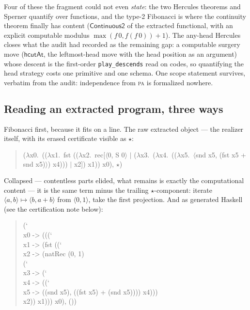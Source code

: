 Four of these the fragment could not even \emph{state}: the two Hercules
theorems and Sperner quantify over functions, and the type-2 Fibonacci is
where the continuity theorem finally has content ($\mathsf{Continuous2}$ of
the extracted functional, with an explicit computable modulus
$\max(f\,0, f(f\,0))+1$). The any-head Hercules closes what the audit had
recorded as the remaining gap: a computable surgery move ($\mathsf{hcutAt}$,
the leftmost-head move with the head position as an argument) whose descent
is the first-order \texttt{play\_descends} read on codes, so quantifying
the head strategy costs one primitive and one schema. One scope statement
survives, verbatim from the audit: independence from \textsc{pa} is
formalized nowhere.

\subsection*{Reading an extracted program, three ways}

Fibonacci first, because it fits on a line. The raw extracted object ---
the realizer itself, with its erased certificate visible as $\star$:
\begin{quote}\ttfamily\small
($\lambda$x0.\ (($\lambda$x1.\ fst (($\lambda$x2.\ rec[$\langle$0, S 0$\rangle$
$\mid$ ($\lambda$x3.\ ($\lambda$x4.\ (($\lambda$x5.\ $\langle$snd x5, (fst x5 + snd
x5)$\rangle$) x4))) $\mid$ x2]) x1)) x0), $\star$)
\end{quote}
Collapsed --- contentless parts elided, what remains is exactly the
computational content --- it is the same term minus the trailing
$\star$-component: iterate $\langle a,b\rangle \mapsto \langle b,
a{+}b\rangle$ from $\langle 0,1\rangle$, take the first projection. And as
generated Haskell (see the certification note below):
\begin{quote}\ttfamily\small
(\char`\\ x0 -> (((\char`\\ x1 -> (fst ((\char`\\ x2 -> (natRec (0, 1)\\
\hspace*{1.2em}(\char`\\ x3 -> (\char`\\ x4 -> ((\char`\\ x5 -> ((snd x5), ((fst x5) + (snd x5)))) x4)))\\
\hspace*{1.2em}x2)) x1))) x0), ())
\end{quote}

